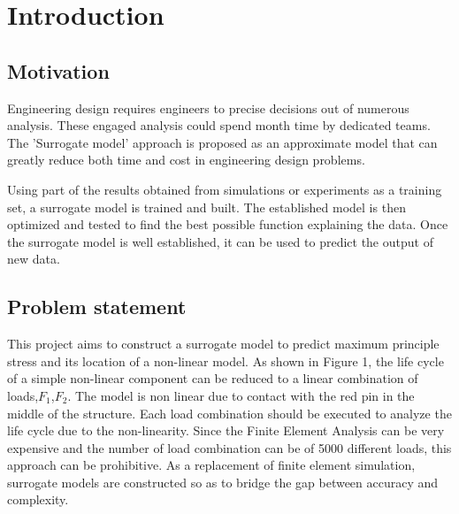 \documentclass[conference]{IEEEtran}
\begin{document}
\section{Introduction}
\subsection{Motivation}
\label{sec:problem-statement}

Engineering design requires engineers to precise decisions out of numerous analysis. These engaged analysis could spend month time by dedicated teams. The 'Surrogate model' approach is proposed as an approximate model that can greatly reduce both time and cost in engineering design problems\cite{forrester2008engineering}.

Using part of the results obtained from simulations or experiments as a training set, a surrogate model is trained and built. The established model is then optimized and tested to find the best possible function explaining the data. Once the surrogate model is well established, it can be used to predict the output of new data\cite{chiplunkar2016sparse}.

\subsection{Problem statement}
\label{sec:problem-statement}
This project aims to construct a surrogate model to predict maximum principle stress and its location of a non-linear model. As shown in Figure 1, the life cycle of a simple non-linear component can be reduced to a linear combination of loads,$F_1$,$F_2$. The model is non linear due to contact with the red pin in the middle of the structure. Each load combination should be executed to analyze the life cycle due to the non-linearity. Since the Finite Element Analysis can be very expensive and the number of load combination can be of 5000 different loads, this approach can be prohibitive. As a replacement of finite element simulation,  surrogate models are constructed so as to bridge the gap between accuracy and complexity. 
\end{document}

